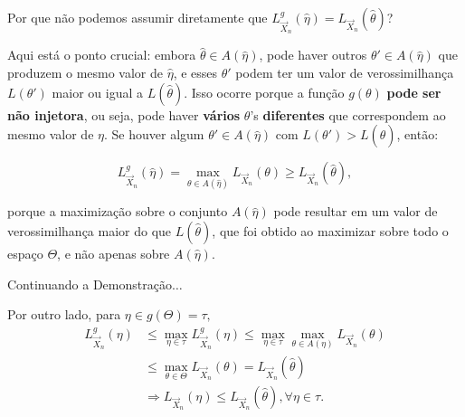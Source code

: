 \documentclass[12pt]{beamer}
\begin{document}
\begin{frame}{Por que não podemos assumir diretamente que \( L_{\vec{X}_n}^{g}(\hat{\eta}) = L_{\vec{X}_n}(\hat{\theta}) \)?}
	\begin{block}{}
		\justifying
		Aqui está o ponto crucial: embora \( \hat{\theta} \in A(\hat{\eta}) \), pode haver outros \( \theta' \in A(\hat{\eta}) \) que produzem o mesmo valor de \( \hat{\eta} \), e esses \( \theta' \) podem ter um valor de verossimilhança \( L(\theta') \) maior ou igual a \( L(\hat{\theta}) \). Isso ocorre porque a função \( g(\theta) \) \textbf{pode ser não injetora}, ou seja, pode haver \textbf{vários} \( \theta \)'s \textbf{diferentes} que correspondem ao mesmo valor de \( \eta \). Se houver algum \( \theta' \in A(\hat{\eta}) \) com \( L(\theta') > L(\hat{\theta}) \), então:
		
		\[
		L_{\vec{X}_n}^{g}(\hat{\eta}) = \max_{\theta \in A(\hat{\eta})} L_{\vec{X}_n}(\theta) \geq L_{\vec{X}_n}(\hat{\theta}),
		\]
		
		porque a maximização sobre o conjunto \( A(\hat{\eta}) \) pode resultar em um valor de verossimilhança maior do que \( L(\hat{\theta}) \), que foi obtido ao maximizar sobre todo o espaço \( \Theta \), e não apenas sobre \( A(\hat{\eta}) \).
		
	\end{block}
\end{frame}

\begin{frame}{Continuando a Demonstração$\ldots$}
	\begin{block}{}
		\justifying
		Por outro lado, para $\eta\in g(\Theta)=\tau,$
		\begin{align*}
			L_{\vec{X}_{n}}^{g}(\eta)&\leq {\displaystyle \max_{\eta\in \tau}L_{\vec{X}_{n}}^{g}(\eta)}\leq \max_{\eta\in\tau}\max_{\theta\in A(\eta)}L_{\vec{X}_{n}}(\theta)\\
			&\leq \max_{\theta\in \Theta}L_{\vec{X}_{n}}(\theta)=L_{\vec{X}_{n}}(\hat{\theta})\\
			&\Rightarrow L_{\vec{X}_{n}}(\eta)\leq L_{\vec{X}_{n}}(\hat{\theta}), \forall \eta\in\tau.
		\end{align*}
	\end{block}
\end{frame}
\end{document}
